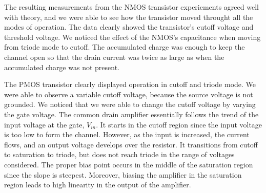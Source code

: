 The resulting measurements from the NMOS transistor experiements agreed well with theory, and we were able to see how the transistor moved throught all the modes of operation. The data clearly showed the transistor's cutoff voltage and threshold voltage. We noticed the effect of the NMOS's capacitance when moving from triode mode to cutoff. The accumulated charge was enough to keep the channel open so that the drain current was twice as large as when the accumulated charge was not present. 
  
The PMOS transistor clearly displayed operation in cutoff and triode mode. We were able to observe a variable cutoff voltage, because the source voltage is not grounded. We noticed that we were able to change the cutoff voltage by varying the gate voltage.
The common drain amplifier essentially follows the trend of the input voltage at the gate, $V_{in}$. It starts in the cutoff region since the input voltage is too low to form the channel. However, as the input is increased, the current flows, and an output voltage develops over the resistor. It transitions from cutoff to saturation to triode, but does not reach triode in the range of voltages considered. The proper bias point occurs in the middle of the saturation region since the slope is steepest. Moreover, biasing the amplifier in the saturation region leads to high linearity in the output of the amplifier.

